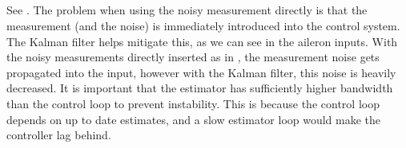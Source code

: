 \subsection{} %
See . The problem when using the noisy measurement directly is that the measurement (and the noise) is immediately introduced into the control system. The Kalman filter helps mitigate this, as we can see in the aileron inputs. With the noisy measurements directly inserted as in , the measurement noise gets propagated into the input, however with the Kalman filter, this noise is heavily decreased. It is important that the estimator has sufficiently higher bandwidth than the control loop to prevent instability. This is because the control loop depends on up to date estimates, and a slow estimator loop would make the controller lag behind.




